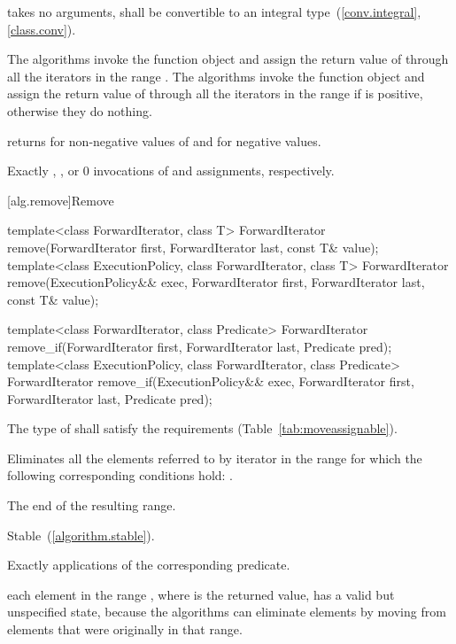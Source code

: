 \begin{itemdescr}
\pnum
\requires
{} takes no arguments,
shall be convertible to an integral type~(\ref{conv.integral}, \ref{class.conv}).

\pnum
\effects
The  algorithms invoke the function object  and assign the return
value of  through all the iterators in the range
. The  algorithms invoke the function object
 and assign the return value of  through all the iterators in
the range  if  is positive,
otherwise they do nothing.

\pnum
\returns {} returns  for non-negative values of 
and  for negative values.

\pnum
\complexity
Exactly
,
, or 0
invocations of  and assignments, respectively.
\end{itemdescr}

[alg.remove]{Remove}

%
%
\begin{itemdecl}
template<class ForwardIterator, class T>
  ForwardIterator remove(ForwardIterator first, ForwardIterator last,
                         const T& value);
template<class ExecutionPolicy, class ForwardIterator, class T>
  ForwardIterator remove(ExecutionPolicy&& exec,
                         ForwardIterator first, ForwardIterator last,
                         const T& value);

template<class ForwardIterator, class Predicate>
  ForwardIterator remove_if(ForwardIterator first, ForwardIterator last,
                            Predicate pred);
template<class ExecutionPolicy, class ForwardIterator, class Predicate>
  ForwardIterator remove_if(ExecutionPolicy&& exec,
                            ForwardIterator first, ForwardIterator last,
                            Predicate pred);
\end{itemdecl}

\begin{itemdescr}
\pnum
\requires
The type of
shall satisfy the 
requirements (Table~\ref{tab:moveassignable}).

\pnum
\effects
Eliminates all the elements referred to by iterator
in the range 
for which the following corresponding conditions hold:
.

\pnum
\returns
The end of the resulting range.

\pnum
\remarks Stable~(\ref{algorithm.stable}).

\pnum
\complexity
Exactly
applications of the corresponding predicate.

\pnum
\realnote each element in the range , where  is
the returned value, has a valid but unspecified state, because the algorithms
can eliminate elements by moving from elements that were originally
in that range.
\end{itemdescr}


